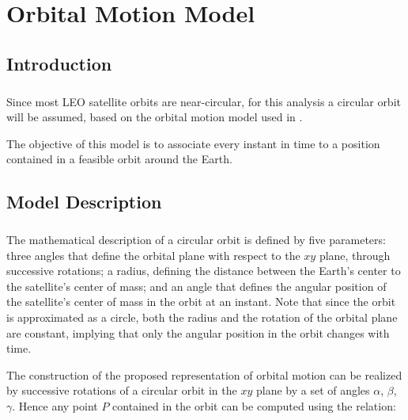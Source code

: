 %
%
%
%
%
%
%
%
%
%

\chapter{Orbital Motion Model} \label{ch:orbital-motion-model}

\section{Introduction}

\paragraph{}
\indent 
Since most LEO satellite orbits are near-circular, for this analysis a circular orbit will be assumed, based on the orbital motion model used in \cite{Edemar}.

\indent
The objective of this model is to associate every instant in time to a position contained in a feasible orbit around the Earth.

\section{Model Description}

\paragraph{}
\indent

The mathematical description of a circular orbit is defined by five parameters: three angles that define the orbital plane with respect to the $xy$ plane, through successive rotations; a radius, defining the distance between the Earth's center to the satellite's center of mass; and an angle that defines the angular position of the satellite's center of mass in the orbit at an instant. Note that since the orbit is approximated as a circle, both the radius and the rotation of the orbital plane are constant, implying that only the angular position in the orbit changes with time. 

\indent 
The construction of the proposed representation of orbital motion can be realized by successive rotations of a circular orbit in the $xy$ plane by a set of angles $\alpha$, $\beta$, $\gamma$. Hence any point $P$ contained in the orbit can be computed using the relation:

